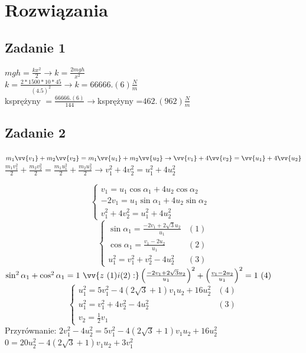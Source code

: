 \documentclass[14pt]{extarticle}
\begin{document}
    \section{Rozwiązania}
    \subsection{Zadanie 1}
    \Large
        \(mgh=\frac{kx^2}{2} \rightarrow k=\frac{2mgh}{x^2}\)\\
        \(k=\frac{2\ast 1500 \ast 10\ast 45}{(4.5)^2} \rightarrow k=66666.(6)\frac{N}{m}\)\\
        k\footnotesize sprężyny \Large\(=\frac{66666.(6)}{144} \rightarrow\)k\footnotesize sprężyny \LARGE=\underline{\(462.(962)\frac{N}{m}\)}
    \subsection{Zadanie 2}
    \large
    $m_1\vv{v_1}+m_2\vv{v_2}=m_1\vv{u_1}+m_2\vv{u_2} \rightarrow \vv{v_1} + 4\vv{v_2} = \vv{u_1} + 4\vv{u_2}$\\
    $\frac{m_1v_1^2}{2}+\frac{m_2v_2^2}{2}=\frac{m_1u_1^2}{2}+\frac{m_2u_2^2}{2} \rightarrow v_1^2 + 4v_2^2 = u_1^2 + 4u_2^2 $
    
    \begin{equation*}
        \begin{cases}
            v_1 = u_1\cos\alpha _1 + 4u_2\cos\alpha _2 &\\
            -2v_1  = u_1\sin\alpha _1 + 4u_2\sin\alpha _2 &\\
            v_1^2 + 4v_2^2 = u_1^2 + 4u_2^2  &
        \end{cases}
    \end{equation*}
    \begin{equation*}
        \begin{cases}
            \sin\alpha _1 = \frac{-2v_1+2{\sqrt{3}}u_2}{u_1}&(1)\\
            \cos\alpha _1 = \frac{v_1-2u_2}{u_1}&(2)\\
            u_1^2 = v_1^2 + v_2^2 - 4u_2^2&(3)
        \end{cases}
    \end{equation*}
    $\sin^2\alpha _1 + \cos^2\alpha _1 = 1\ \vv{z \ (1)i(2):}
    \left(\frac{-2v_1+2{\sqrt{3}}u_2}{u_1}\right)^2 + \left(\frac{v_1-2u_2}{u_1}\right)^2 = 1 \ (4)$
    \begin{equation*}
        \begin{cases}
            u_1^2 = 5v_1^2-4\left(2{\sqrt{3}}+1\right)v_1u_2+16u_2^2&(4)\\
            u_1^2 = v_1^2 + 4v_2^2 - 4u_2^2&(3)\\
            v_2 = \frac{1}{2}v_1&
        \end{cases}
    \end{equation*}
        Przyrównanie: $2v_1^2 - 4u_2^2=5v_1^2-4\left(2{\sqrt{3}}+1\right)v_1u_2+16u_2^2$\\
        $ 0 = 20u_2^2-4\left(2{\sqrt{3}}+1\right)v_1u_2+3v_1^2 $\\
\end{document}
